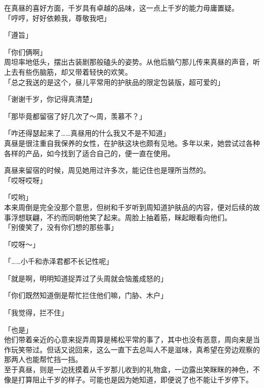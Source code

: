 在真昼的喜好方面，千岁具有卓越的品味，这一点上千岁的能力毋庸置疑。\\

「哼哼，好好依赖我，尊敬我吧」

「遵旨」

「你们俩啊」\\

周坦率地低头，摆出古装剧那般磕头的姿势。从他后脑勺那儿传来真昼的声音，听上去有些伤脑筋，却又带着轻快的欢笑。\\

「总之我送的是这个，昼儿平常用的护肤品的限定包装版，超可爱的」

「谢谢千岁，你记得真清楚」

「那毕竟都留宿了好几次了～周，羡慕不？」

「咋还得瑟起来了……真昼用的什么我又不是不知道」\\

真昼是很注重自我保养的女性，在护肤这块也颇有见地。多年以来，她尝试过各种各样的产品，如今找到了适合自己的，便一直在使用。

真昼来留宿的时候，周见她用过许多次，能记住也是理所当然的。\\

「哎呀哎呀」

「哎哟」\\

本来周倒是完全没那个意思，但树和千岁听到周知道护肤品的内容，便对后续的故事浮想联翩，不约而同朝他笑了起来。周脸上抽着筋，眯起眼看向他们。\\

「别傻笑了，没有你们想的那些事」

「哎呀～」

「……小千和赤泽君都不长记性呢」

「就是啊，明明知道捉弄过了头周就会恼羞成怒的」

「你们既然知道倒是帮忙拦住他们嘛，门胁、木户」

「我觉得，拦不住」

「也是」\\

他们带着亲近的心意来捉弄周算是稀松平常的事了，其中也没有恶意，周向来是当作玩笑带过。但话又说回来，这么一直下去总叫人不是滋味，真希望在旁边观察的那两人也能帮忙挡一挡。\\

至于真昼，则是一边抚摸着从千岁那儿收到的礼物盒，一边露出笑眯眯的神色，不像是打算阻止千岁的样子。可能也是因为她知道，即便说了也不能让千岁停下。\\

